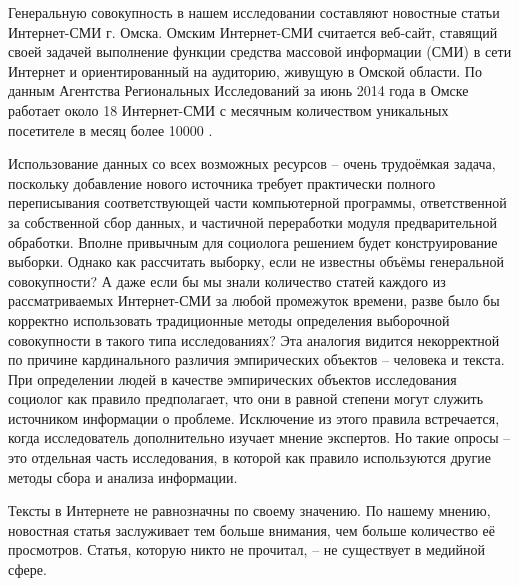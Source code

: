 Генеральную совокупность в нашем исследовании составляют новостные статьи Интернет-СМИ г. Омска. Омским Интернет-СМИ считается веб-сайт, ставящий своей задачей выполнение функции средства массовой информации (СМИ) в сети Интернет и ориентированный на аудиторию, живущую в Омской области. По данным Агентства Региональных Исследований за июнь 2014 года в Омске работает около 18 Интернет-СМИ с месячным количеством уникальных посетителе в месяц более 10000 \cite{ari_rating}. 

Использование данных со всех возможных ресурсов -- очень трудоёмкая задача, поскольку добавление нового источника требует практически полного переписывания соответствующей части компьютерной программы, ответственной за собственной сбор данных, и частичной переработки модуля предварительной обработки. Вполне привычным для социолога решением будет конструирование выборки. Однако как рассчитать выборку, если не известны объёмы генеральной совокупности? А даже если бы мы знали количество статей каждого из рассматриваемых Интернет-СМИ за любой промежуток времени, разве было бы корректно использовать традиционные методы определения выборочной совокупности в такого типа исследованиях? Эта аналогия видится некорректной по причине кардинального различия эмпирических объектов -- человека и текста. При определении людей в качестве эмпирических объектов исследования социолог как правило предполагает, что они в равной степени могут служить источником информации о проблеме. Исключение из этого правила встречается, когда исследователь дополнительно изучает мнение экспертов. Но такие опросы -- это отдельная часть исследования, в которой как правило используются другие методы сбора и анализа информации.

Тексты в Интернете не равнозначны по своему значению. По нашему мнению, новостная статья заслуживает тем больше внимания, чем больше количество её просмотров. Статья, которую никто не прочитал, -- не существует в медийной сфере. %

